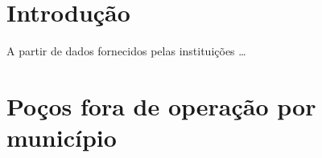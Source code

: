 \documentclass[a4paper, 12pt, openright, oneside, english, brazil, article]{abntex2}
\begin{document}
	\pretextual
	\maketitle
	
	\textual
	
	
	\section{Introdução}
	
	A partir de dados fornecidos pelas instituições \ldots
	
	
	
	\section{Poços fora de operação por município}
	
\end{document}
